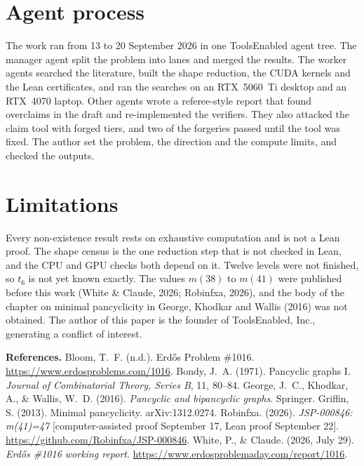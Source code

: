 \documentclass[10pt]{article}
\begin{document}
\section{Agent process}
The work ran from 13 to 20 September 2026 in one ToolsEnabled agent tree. The manager agent split the problem into lanes and merged the results. The worker agents searched the literature, built the shape reduction, the CUDA kernels and the Lean certificates, and ran the searches on an RTX~5060~Ti desktop and an RTX~4070 laptop. Other agents wrote a referee-style report that found overclaims in the draft and re-implemented the verifiers. They also attacked the claim tool with forged tiers, and two of the forgeries passed until the tool was fixed. The author set the problem, the direction and the compute limits, and checked the outputs.

\section{Limitations}
Every non-existence result rests on exhaustive computation and is not a Lean proof. The shape census is the one reduction step that is not checked in Lean, and the CPU and GPU checks both depend on it. Twelve levels were not finished, so $t_6$ is not yet known exactly. The values $m(38)$ to $m(41)$ were published before this work (White \& Claude, 2026; Robinfxa, 2026), and the body of the chapter on minimal pancyclicity in George, Khodkar and Wallis (2016) was not obtained. The author of this paper is the founder of ToolsEnabled, Inc., generating a conflict of interest.

\vspace{0.2ex}
{\footnotesize\textbf{References.}
Bloom, T.~F. (n.d.). Erd\H{o}s Problem \#1016. \url{https://www.erdosproblems.com/1016}.
Bondy, J.~A. (1971). Pancyclic graphs I. \emph{Journal of Combinatorial Theory, Series B}, 11, 80--84.
George, J.~C., Khodkar, A., \& Wallis, W.~D. (2016). \emph{Pancyclic and bipancyclic graphs}. Springer.
Griffin, S. (2013). Minimal pancyclicity. arXiv:1312.0274.
Robinfxa. (2026). \emph{JSP-000846: m(41)=47} [computer-assisted proof September 17, Lean proof September 22]. \url{https://github.com/Robinfxa/JSP-000846}.
White, P., \& Claude. (2026, July 29). \emph{Erd\H{o}s \#1016 working report}. \url{https://www.erdosproblemaday.com/report/1016}.}
\end{document}
